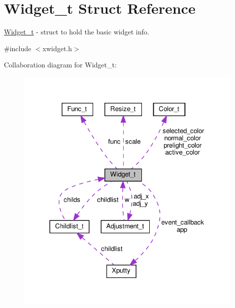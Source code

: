 \hypertarget{structWidget__t}{}\section{Widget\+\_\+t Struct Reference}
\label{structWidget__t}


\hyperlink{structWidget__t}{Widget\+\_\+t} -\/ struct to hold the basic widget info.  




{\ttfamily \#include $<$xwidget.\+h$>$}



Collaboration diagram for Widget\+\_\+t\+:
\nopagebreak
\begin{figure}[H]
\begin{center}
\leavevmode
\includegraphics[width=316pt]{structWidget__t__coll__graph}
\end{center}
\end{figure}
